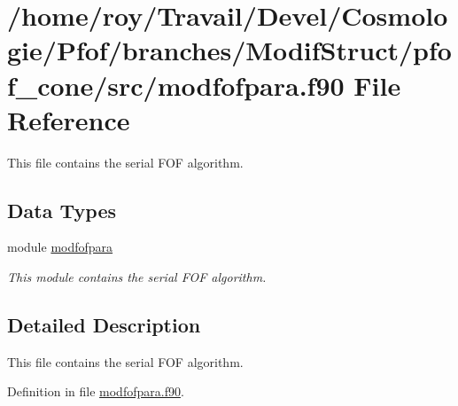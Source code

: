 \hypertarget{modfofpara_8f90}{\section{/home/roy/\-Travail/\-Devel/\-Cosmologie/\-Pfof/branches/\-Modif\-Struct/pfof\-\_\-cone/src/modfofpara.f90 File Reference}
\label{modfofpara_8f90}
}


This file contains the serial F\-O\-F algorithm.  


\subsection*{Data Types}
\begin{DoxyCompactItemize}
\item 
module \hyperlink{classmodfofpara}{modfofpara}
\begin{DoxyCompactList}\small\item\em This module contains the serial F\-O\-F algorithm. \end{DoxyCompactList}\end{DoxyCompactItemize}


\subsection{Detailed Description}
This file contains the serial F\-O\-F algorithm. 

Definition in file \hyperlink{modfofpara_8f90_source}{modfofpara.\-f90}.

